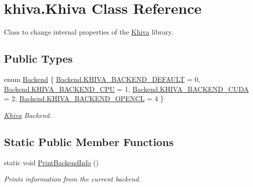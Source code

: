 \hypertarget{classkhiva_1_1_khiva}{}\section{khiva.\+Khiva Class Reference}
\label{classkhiva_1_1_khiva}


Class to change internal properties of the \mbox{\hyperlink{classkhiva_1_1_khiva}{Khiva}} library.  


\subsection*{Public Types}
\begin{DoxyCompactItemize}
\item 
enum \mbox{\hyperlink{classkhiva_1_1_khiva_a149c512eefcef84e8e94eca721d8cd8f}{Backend}} \{ \mbox{\hyperlink{classkhiva_1_1_khiva_a149c512eefcef84e8e94eca721d8cd8fa50b86107f9208ed92a2b46d4f8a15f1a}{Backend.\+K\+H\+I\+V\+A\+\_\+\+B\+A\+C\+K\+E\+N\+D\+\_\+\+D\+E\+F\+A\+U\+LT}} = 0, 
\mbox{\hyperlink{classkhiva_1_1_khiva_a149c512eefcef84e8e94eca721d8cd8fa3798a2e99dee408ddbb160ffeb68eb4c}{Backend.\+K\+H\+I\+V\+A\+\_\+\+B\+A\+C\+K\+E\+N\+D\+\_\+\+C\+PU}} = 1, 
\mbox{\hyperlink{classkhiva_1_1_khiva_a149c512eefcef84e8e94eca721d8cd8fa289887560a71d121a8d14d39280ac7cc}{Backend.\+K\+H\+I\+V\+A\+\_\+\+B\+A\+C\+K\+E\+N\+D\+\_\+\+C\+U\+DA}} = 2, 
\mbox{\hyperlink{classkhiva_1_1_khiva_a149c512eefcef84e8e94eca721d8cd8fa18d3fb3a791bfb3ceeaa8582f9347dd0}{Backend.\+K\+H\+I\+V\+A\+\_\+\+B\+A\+C\+K\+E\+N\+D\+\_\+\+O\+P\+E\+N\+CL}} = 4
 \}
\begin{DoxyCompactList}\small\item\em \mbox{\hyperlink{classkhiva_1_1_khiva}{Khiva}} Backend. \end{DoxyCompactList}\end{DoxyCompactItemize}
\subsection*{Static Public Member Functions}
\begin{DoxyCompactItemize}
\item 
static void \mbox{\hyperlink{classkhiva_1_1_khiva_ada7dc4e61974d5b14204063e520875c8}{Print\+Backend\+Info}} ()
\begin{DoxyCompactList}\small\item\em Prints information from the current backend. \end{DoxyCompactList}\end{DoxyCompactItemize}
